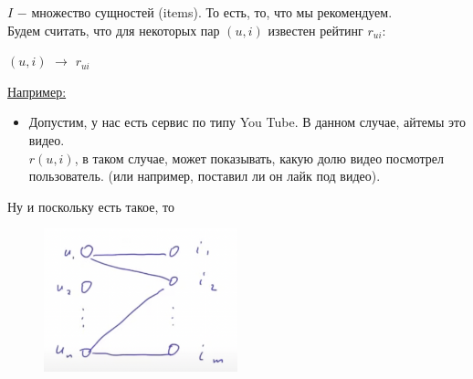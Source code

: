         $I$ $-$ множество сущностей (items). То есть, то, что мы рекомендуем. \\

        Будем считать, что для некоторых пар $(u, i)$ известен рейтинг $r_{ui}$:
        \begin{center}
            $(u, i)$ $\longrightarrow$ $r_{ui}$
        \end{center}

       \underline{Например:}
       \begin{itemize}
           \item Допустим, у нас есть сервис по типу You Tube. В данном случае, айтемы это видео.\\

           $r(u, i)$, в таком случае,  может показывать, какую долю видео посмотрел пользователь. (или например, поставил ли он лайк под видео).
       \end{itemize}
       Ну и поскольку есть такое, то 
       \begin{figure}[H]
            \centering
            \includegraphics[width=0.5\textwidth]{images/14lecture/user-item-graph.png}
        \end{figure} 

